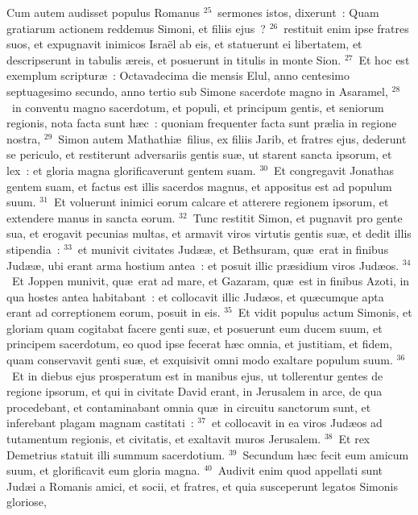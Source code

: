  Cum autem audisset populus Romanus
${}^{25}$~sermones istos, dixerunt~: Quam gratiarum actionem reddemus Simoni, et filiis ejus~?
${}^{26}$~restituit enim ipse fratres suos, et expugnavit inimicos Isra\"el ab eis, et statuerunt ei libertatem, et descripserunt in tabulis \ae reis, et posuerunt in titulis in monte Sion.
${}^{27}$~Et hoc est exemplum scriptur\ae~: Octavadecima die mensis Elul, anno centesimo septuagesimo secundo, anno tertio sub Simone sacerdote magno in Asaramel,
${}^{28}$~in conventu magno sacerdotum, et populi, et principum gentis, et seniorum regionis, nota facta sunt h\ae c~: quoniam frequenter facta sunt pr\ae lia in regione nostra,
${}^{29}$~Simon autem Mathathi\ae\ filius, ex filiis Jarib, et fratres ejus, dederunt se periculo, et restiterunt adversariis gentis su\ae , ut starent sancta ipsorum, et lex~: et gloria magna glorificaverunt gentem suam.
${}^{30}$~Et congregavit Jonathas gentem suam, et factus est illis sacerdos magnus, et appositus est ad populum suum.
${}^{31}$~Et voluerunt inimici eorum calcare et atterere regionem ipsorum, et extendere manus in sancta eorum.
${}^{32}$~Tunc restitit Simon, et pugnavit pro gente sua, et erogavit pecunias multas, et armavit viros virtutis gentis su\ae , et dedit illis stipendia~:
${}^{33}$~et munivit civitates Jud\ae \ae , et Bethsuram, qu\ae\ erat in finibus Jud\ae \ae , ubi erant arma hostium antea~: et posuit illic pr\ae sidium viros Jud\ae os.
${}^{34}$~Et Joppen munivit, qu\ae\ erat ad mare, et Gazaram, qu\ae\ est in finibus Azoti, in qua hostes antea habitabant~: et collocavit illic Jud\ae os, et qu\ae cumque apta erant ad correptionem eorum, posuit in eis.
${}^{35}$~Et vidit populus actum Simonis, et gloriam quam cogitabat facere genti su\ae , et posuerunt eum ducem suum, et principem sacerdotum, eo quod ipse fecerat h\ae c omnia, et justitiam, et fidem, quam conservavit genti su\ae , et exquisivit omni modo exaltare populum suum.
${}^{36}$~Et in diebus ejus prosperatum est in manibus ejus, ut tollerentur gentes de regione ipsorum, et qui in civitate David erant, in Jerusalem in arce, de qua procedebant, et contaminabant omnia qu\ae\ in circuitu sanctorum sunt, et inferebant plagam magnam castitati~:
${}^{37}$~et collocavit in ea viros Jud\ae os ad tutamentum regionis, et civitatis, et exaltavit muros Jerusalem.
${}^{38}$~Et rex Demetrius statuit illi summum sacerdotium.
${}^{39}$~Secundum h\ae c fecit eum amicum suum, et glorificavit eum gloria magna.
${}^{40}$~Audivit enim quod appellati sunt Jud\ae i a Romanis amici, et socii, et fratres, et quia susceperunt legatos Simonis gloriose,
